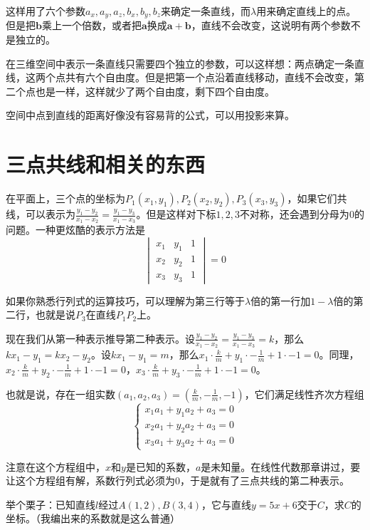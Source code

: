 这样用了六个参数$a_x,a_y,a_z,b_x,b_y,b_z$来确定一条直线，而$\lambda$用来确定直线上的点。但是把$\mathbf{b}$乘上一个倍数，或者把$\mathbf{a}$换成$\mathbf{a}+\mathbf{b}$，直线不会改变，这说明有两个参数不是独立的。

在三维空间中表示一条直线只需要四个独立的参数，可以这样想：两点确定一条直线，这两个点共有六个自由度。但是把第一个点沿着直线移动，直线不会改变，第二个点也是一样，这样就少了两个自由度，剩下四个自由度。

空间中点到直线的距离好像没有容易背的公式，可以用投影来算。
\section{三点共线和相关的东西}
在平面上，三个点的坐标为$P_1(x_1,y_1),P_2(x_2,y_2),P_3(x_3,y_3)$，如果它们共线，可以表示为$\frac{y_1-y_2}{x_1-x_2}=\frac{y_1-y_3}{x_1-x_3}$。但是这样对下标$1,2,3$不对称，还会遇到分母为$0$的问题。一种更炫酷的表示方法是
\begin{equation*}
\begin{vmatrix}
x_1 & y_1 & 1 \\
x_2 & y_2 & 1 \\
x_3 & y_3 & 1
\end{vmatrix}=0
\end{equation*}

如果你熟悉行列式的运算技巧，可以理解为第三行等于$\lambda$倍的第一行加$1-\lambda$倍的第二行，也就是说$P_3$在直线$P_1 P_2$上。

现在我们从第一种表示推导第二种表示。设$\frac{y_1-y_2}{x_1-x_2}=\frac{y_1-y_3}{x_1-x_3}=k$，那么$k x_1-y_1=k x_2-y_2$。设$k x_1-y_1=m$，那么$x_1 \cdot \frac{k}{m}+y_1 \cdot -\frac{1}{m}+1 \cdot -1=0$。同理，$x_2 \cdot \frac{k}{m}+y_2 \cdot -\frac{1}{m}+1 \cdot -1=0$，$x_3 \cdot \frac{k}{m}+y_3 \cdot -\frac{1}{m}+1 \cdot -1=0$。

也就是说，存在一组实数$(a_1,a_2,a_3)=(\frac{k}{m},-\frac{1}{m},-1)$，它们满足线性齐次方程组
\begin{equation*}
\begin{cases}
x_1 a_1+y_1 a_2+a_3=0 \\
x_2 a_1+y_2 a_2+a_3=0 \\
x_3 a_1+y_3 a_2+a_3=0
\end{cases}
\end{equation*}

注意在这个方程组中，$x$和$y$是已知的系数，$a$是未知量。在线性代数那章讲过，要让这个方程组有解，系数行列式必须为$0$，于是就有了三点共线的第二种表示。

举个栗子：已知直线$l$经过$A(1,2),B(3,4)$，它与直线$y=5x+6$交于$C$，求$C$的坐标。（我编出来的系数就是这么普通）

